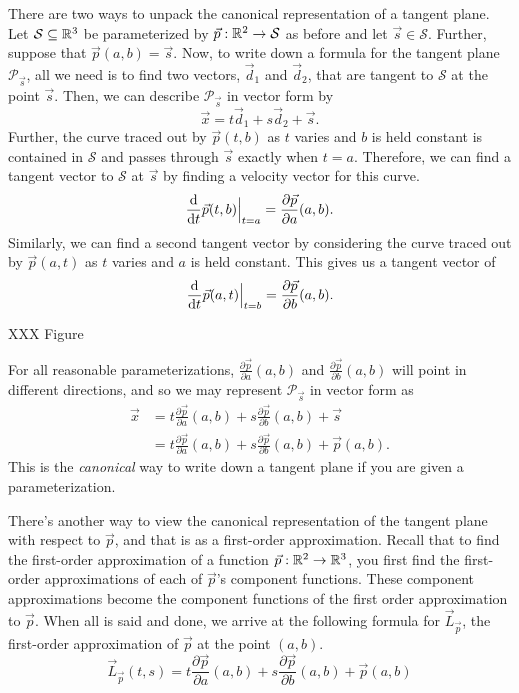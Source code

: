 There are two ways to unpack the canonical representation of a tangent plane.
Let $\mathcal S\subseteq\mathbb{R}^3$ be parameterized by $\vec p:\mathbb{R}^2\to\mathcal S$ as before
and let $\vec s\in\mathcal S$.  Further, suppose that $\vec p(a,b)=\vec s$.  Now,
to write down a formula for the tangent plane $\mathcal P_{\vec s}$, all we need is to
find two vectors, $\vec d_1$ and $\vec d_2$, that are tangent to $\mathcal S$ at the point $\vec s$.
Then, we can describe $\mathcal P_{\vec s}$ in vector form by
\[
	\vec x=t\vec d_1+s\vec d_2+\vec s.
\]
Further, the curve traced out by $\vec p(t,b)$ as $t$ varies and $b$ is held constant is
contained in $\mathcal S$ and passes through $\vec s$ exactly when $t=a$.  Therefore, we can
find a tangent vector to $\mathcal S$ at $\vec s$ by finding a velocity vector for this curve.
\[
	\frac{\mathrm{d}}{\mathrm{d} t} \vec p(t,b)\Big|_{t=a} = \frac{\partial \vec p}{\partial a}(a,b).
\]
Similarly, we can find a second tangent vector by considering the curve traced out by $\vec p(a,t)$
as $t$ varies and $a$ is held constant.  This gives us a tangent vector of
\[
	\frac{\mathrm{d}}{\mathrm{d} t} \vec p(a,t)\Big|_{t=b} = \frac{\partial \vec p}{\partial b}(a,b).
\]

XXX Figure

For all reasonable parameterizations, $\frac{\partial \vec p}{\partial a}(a,b)$ and $\frac{\partial \vec p}{\partial b}(a,b)$
will point in different directions, and so we may represent $\mathcal P_{\vec s}$ in vector form as
	\begin{align*}
		\vec x &= t \frac{\partial \vec p}{\partial a}(a,b) + s\frac{\partial \vec p}{\partial b}(a,b)
		+\vec s\\
		&= t \frac{\partial \vec p}{\partial a}(a,b) + s\frac{\partial \vec p}{\partial b}(a,b)
		+\vec p(a,b).
	\end{align*}
This is the \emph{canonical} way to write down a tangent plane if you are given a parameterization.


There's another way to view the canonical representation of the tangent plane with respect to $\vec p$,
and that is as a first-order approximation.  Recall that to find the first-order approximation
of a function $\vec p:\mathbb{R}^2\to\mathbb{R}^3$, you first find the first-order approximations of each of $\vec p$'s
component functions.  These component approximations become the component functions
of the first order approximation to $\vec p$.  When all is said and done, we arrive at the following
formula for $\vec L_{\vec p}$, the first-order approximation of $\vec p$ at the point $(a,b)$.
\[
	\vec L_{\vec p}(t,s) = t \frac{\partial \vec p}{\partial a}(a,b) + s\frac{\partial \vec p}{\partial b}(a,b)
		+\vec p(a,b)
\]

